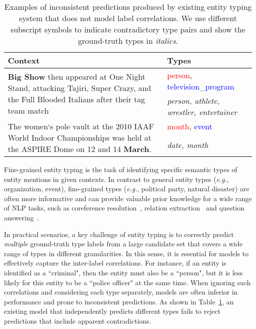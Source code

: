 \documentclass[11pt,a4paper]{article}
\begin{document}
\begin{table}[t]
\centering
\begin{tabular}{p{4.8cm}|p{2cm}}
\toprule
\bf Context & \bf Types \\
\midrule
\multirow{5}{4.9cm}{\small{\textbf{Big Show} then appeared at One Night Stand, attacking Tajiri, Super Crazy, and the Full Blooded Italians after their tag team match}} &  \multirow{2}{2cm}{\small{\textcolor{red}{person}, \textcolor{blue}{television\_program}}} \\ 
& \\\cline{2-2}
& \multirow{3}{2cm}{\small{\textit{person, athlete, wrestler, entertainer}}}\\
& \\
& \\
\midrule
\multirow{4}{4.9cm}{\small{The women‘s pole vault at the 2010 IAAF World Indoor Championships was held at the ASPIRE Dome on 12 and 14 \textbf{March}.}} & \multirow{2}{2cm}{\small{\textcolor{red}{month}, \textcolor{blue}{event}}}\\ 
& \\
\cline{2-2}
& \multirow{2}{2cm}{\small{\textit{date, month}}}\\
& \\
\bottomrule
\end{tabular}
\caption{Examples of inconsistent predictions produced by existing entity typing system that does not model label correlations. We use different subscript symbols to indicate contradictory type pairs and show the  ground-truth types in \textit{italics}.}
\label{tab:example}
\end{table}

Fine-grained entity typing is the task of identifying specific semantic types of entity mentions in given contexts. In contrast to general entity types (\emph{e.g.}, organization, event), fine-grained types (\emph{e.g.}, political party, natural disaster) are often more informative and can provide valuable prior knowledge for a wide range of NLP tasks, such as coreference resolution~\cite{durrett2014joint}, relation extraction~\cite{yaghoobzadeh2016noise} and question answering~\cite{lee2006fine,yavuz2016improving}.

In practical scenarios, a key challenge of entity typing is to correctly predict \textit{multiple} ground-truth type labels from a large candidate set that covers a wide range of types in different granularities. In this sense, it is essential for models to effectively capture the inter-label correlations. For instance, if an entity is identified as a ``criminal", then the entity must also be a ``person",  but it is less likely for this entity to be a ``police officer" at the same time. When ignoring such correlations and considering each type separately, models are often inferior in performance and prone to inconsistent predictions. As shown in Table~\ref{tab:example}, an existing model that independently predicts different types fails to reject predictions that include apparent contradictions. 
\end{document}
